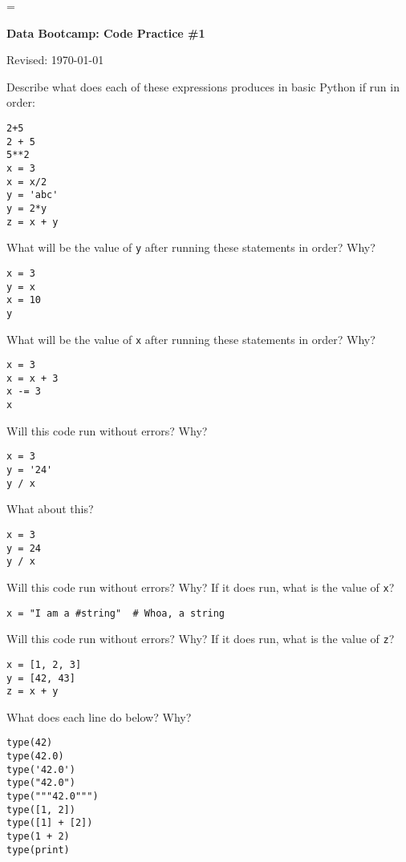 \documentclass[11pt]{exam}
\begin{document}
\parskip=\bigskipamount
\parindent=0.0in
\thispagestyle{empty}


\bigskip\bigskip
\centerline{\Large \bf Data Bootcamp:  Code Practice \#1}
\centerline{Revised: \today}

\begin{questions}
\item Describe what does each of these expressions produces in basic Python if run in order:
\begin{verbatim}
2+5
2 + 5
5**2
x = 3
x = x/2
y = 'abc'
y = 2*y
z = x + y
\end{verbatim}

\item What will be the value of \texttt{y} after running these statements in order? Why?
\begin{verbatim}
x = 3
y = x
x = 10
y
\end{verbatim}

\item What will be the value of \texttt{x} after running these statements in order? Why?
\begin{verbatim}
x = 3
x = x + 3
x -= 3
x
\end{verbatim}

\item Will this code run without errors? Why?
\begin{verbatim}
x = 3
y = '24'
y / x
\end{verbatim}

What about this?
\begin{verbatim}
x = 3
y = 24
y / x
\end{verbatim}

\item Will this code run without errors? Why? If it does run, what is the value of \texttt{x}?
\begin{verbatim}
x = "I am a #string"  # Whoa, a string
\end{verbatim}

\item Will this code run without errors? Why? If it does run, what is the value of \texttt{z}?
\begin{verbatim}
x = [1, 2, 3]
y = [42, 43]
z = x + y
\end{verbatim}

\item What does each line do below? Why?
\begin{verbatim}
type(42)
type(42.0)
type('42.0')
type("42.0")
type("""42.0""")
type([1, 2])
type([1] + [2])
type(1 + 2)
type(print)


\end{verbatim}
\end{questions}
\end{document}
